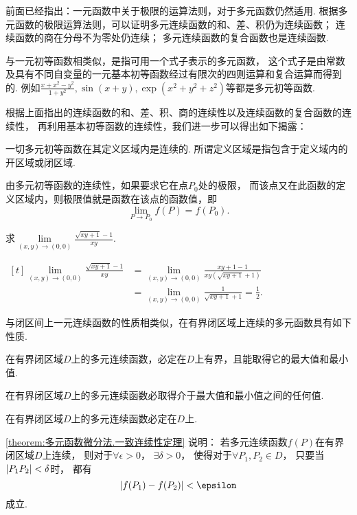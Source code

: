 前面已经指出：一元函数中关于极限的运算法则，对于多元函数仍然适用.
根据多元函数的极限运算法则，可以证明多元连续函数的和、差、积仍为连续函数；
连续函数的商在分母不为零处仍连续；
多元连续函数的复合函数也是连续函数.

与一元初等函数相类似，是指可用一个式子表示的多元函数，
这个式子是由常数及具有不同自变量的一元基本初等函数经过有限次的四则运算和复合运算而得到的.
例如\(\frac{x+x^2-y^2}{1+y^2},\sin(x+y),\exp(x^2+y^2+z^2)\)等都是多元初等函数.

根据上面指出的连续函数的和、差、积、商的连续性以及连续函数的复合函数的连续性，
再利用基本初等函数的连续性，我们进一步可以得出如下揭露：

一切多元初等函数在其定义区域内是连续的.
所谓定义区域是指包含于定义域内的开区域或闭区域.

由多元初等函数的连续性，如果要求它在点\(P_0\)处的极限，
而该点又在此函数的定义区域内，则极限值就是函数在该点的函数值，即\[
	\lim\limits_{P \to P_0} f(P) = f(P_0).
\]

\begin{example}
\def\l{\lim\limits_{(x,y)\to(0,0)}}
求\(\l \frac{\sqrt{xy+1}-1}{xy}\).
\begin{solution}
\(\begin{aligned}[t]
\l \frac{\sqrt{xy+1}-1}{xy}
&= \l \frac{xy+1-1}{xy(\sqrt{xy+1}+1)} \\
&= \l \frac{1}{\sqrt{xy+1}+1}
= \frac{1}{2}.
\end{aligned}\)
\end{solution}
\end{example}

与闭区间上一元连续函数的性质相类似，在有界闭区域上连续的多元函数具有如下性质.

\begin{property}[有界性与最值定理]\label{theorem:多元函数微分法.有界性与最值定理}
在有界闭区域\(D\)上的多元连续函数，必定在\(D\)上有界，且能取得它的最大值和最小值.
\end{property}

\begin{property}[介值定理]\label{theorem:多元函数微分法.介值定理}
在有界闭区域\(D\)上的多元连续函数必取得介于最大值和最小值之间的任何值.
\end{property}

\begin{property}[一致连续性定理]\label{theorem:多元函数微分法.一致连续性定理}
在有界闭区域\(D\)上的多元连续函数必定在\(D\)上.
\end{property}
\cref{theorem:多元函数微分法.一致连续性定理} 说明：
若多元连续函数\(f(P)\)在有界闭区域\(D\)上连续，
则对于\(\forall \epsilon > 0\)，
\(\exists \delta > 0\)，
使得对于\(\forall P_1,P_2 \in D\)，
只要当\(\abs{P_1P_2}<\delta\)时，
都有\[
	\abs{f(P_1)-f(P_2)} < \epsilon
\]成立.

